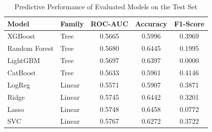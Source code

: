 \begin{table}[h!]
\centering
\caption{Predictive Performance of Evaluated Models on the Test Set}
\label{tab:model_performance}
\begin{tabular}{llccc}
\toprule
\textbf{Model} & \textbf{Family} & \textbf{ROC-AUC} & \textbf{Accuracy} & \textbf{F1-Score} \\
\midrule
XGBoost & Tree & 0.5665 & 0.5996 & 0.3969 \\
Random Forest & Tree & 0.5680 & 0.6445 & 0.1995 \\
LightGBM & Tree & 0.5697 & 0.6397 & 0.0000 \\
CatBoost & Tree & 0.5633 & 0.5961 & 0.4146 \\
LogReg & Linear & 0.5571 & 0.5907 & 0.3871 \\
Ridge & Linear & 0.5745 & 0.6442 & 0.3201 \\
Lasso & Linear & 0.5748 & 0.6458 & 0.0772 \\
SVC & Linear & 0.5767 & 0.6272 & 0.3722 \\
\bottomrule
\end{tabular}
\end{table}
